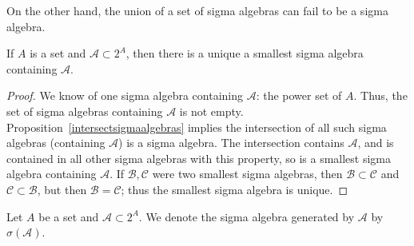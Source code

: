 On the other hand, the union of a set
of sigma algebras can fail to be a
sigma algebra.

\begin{prop}
  If $A$ is a set and
  $\mathcal{A} \subset 2^A$,
  then
  there is a unique a smallest sigma algebra
  containing $\mathcal{A}$.

  \begin{proof}
    We know of one sigma algebra containing $\mathcal{A}$:
    the power set of $A$.
    Thus, the set of sigma algebras containing
    $\mathcal{A}$ is not empty.
    Proposition~\ref{intersectsigmaalgebras}
    implies
    the intersection of all
    such sigma algebras
    (containing $\mathcal{A}$) is a sigma algebra.
    The intersection contains $\mathcal{A}$,
    and is contained in all other sigma algebras
    with this property, so is a smallest sigma
    algebra containing $\mathcal{A}$.
    If $\mathcal{B}, \mathcal{C}$ were two smallest
    sigma algebras, then $\mathcal{B} \subset \mathcal{C}$
    and $\mathcal{C} \subset \mathcal{B}$, but then
    $\mathcal{B} = \mathcal{C}$; thus the smallest
    sigma algebra is unique.
  \end{proof}
\end{prop}


Let $A$ be a set and
$\mathcal{A} \subset 2^A$.
We denote the sigma algebra
generated by $\mathcal{A}$
by $\sigma(\mathcal{A})$.


\strats
